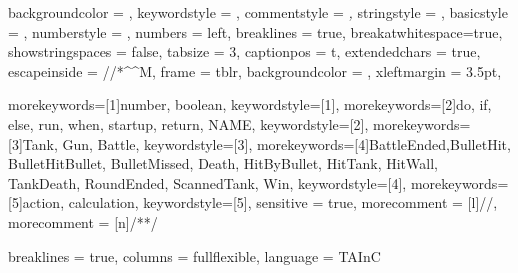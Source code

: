 
\usepackage{listings}


\usepackage{algorithm}%
\usepackage{algpseudocode}%


\captionsetup[lstlisting]{
    format = listing
}

\lstset 
{
    backgroundcolor = \color{white},
    keywordstyle = \color{blue},
    commentstyle = \color{gray!75}\textit,
    stringstyle = \color{green},
    basicstyle = \scriptsize\ttfamily,
    numberstyle = \tiny,
    numbers = left,
    breaklines = true,
    breakatwhitespace=true,
    showstringspaces = false,
    tabsize = 3,
    captionpos = t,
    extendedchars = true,
    escapeinside = {//*}{\^^M}, %
    frame = tblr,
    backgroundcolor = \color{gray!5},
    xleftmargin = 3.5pt,
}

\renewcommand{\lstlistingname}{Code Snippet}

\captionsetup[lstlisting]{format = listing, labelfont = white, textfont = white}

{
    morekeywords=[1]{number, boolean}, 
    keywordstyle=[1]\color{NavyBlue},
    morekeywords=[2]{do, if, else, run, when, startup, return, NAME},
    keywordstyle=[2]\color{Magenta},
    morekeywords=[3]{Tank, Gun, Battle},
    keywordstyle=[3]\color{Green},
    morekeywords=[4]{BattleEnded,BulletHit, BulletHitBullet, BulletMissed, Death, HitByBullet, HitTank, HitWall, TankDeath, RoundEnded, ScannedTank, Win},
    keywordstyle=[4]\color{Bittersweet},
    morekeywords=[5]{action, calculation},
    keywordstyle=[5]\color{Fuchsia},
    sensitive = true,
    morecomment = [l]{//},
    morecomment = [n]{/*}{*/}
}

{
    breaklines = true,
    columns = fullflexible,
    language = TAInC
}

\newcommand{\taincinline}[1]{\lstinline[style = tainc, basicstyle = \ttfamily\normalsize]{#1}}

